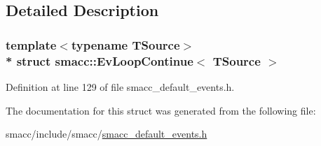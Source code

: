 \subsection{Detailed Description}
\subsubsection*{template$<$typename T\+Source$>$\\*
struct smacc\+::\+Ev\+Loop\+Continue$<$ T\+Source $>$}



Definition at line 129 of file smacc\+\_\+default\+\_\+events.\+h.



The documentation for this struct was generated from the following file\+:\begin{DoxyCompactItemize}
\item 
smacc/include/smacc/\hyperlink{smacc__default__events_8h}{smacc\+\_\+default\+\_\+events.\+h}\end{DoxyCompactItemize}
